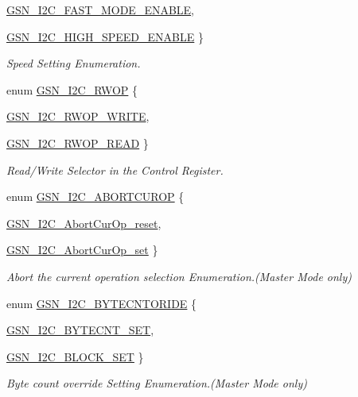 \begin{DoxyCompactItemize}
\hyperlink{a00649_gga75fb1bfd3b52d6ceab35ff62418c6bf6a17def2de96abbf935f2575540969c799}{GSN\_\-I2C\_\-FAST\_\-MODE\_\-ENABLE}, 
\par
\hyperlink{a00649_gga75fb1bfd3b52d6ceab35ff62418c6bf6a1e00b42818c99439a7fc786bba97884f}{GSN\_\-I2C\_\-HIGH\_\-SPEED\_\-ENABLE}
 \}
\begin{DoxyCompactList}\small\item\em Speed Setting Enumeration. \end{DoxyCompactList}\item 
enum \hyperlink{a00649_ga67da6f46815f1aaf8cf6e1a35b13a02c}{GSN\_\-I2C\_\-RWOP} \{ \par
\hyperlink{a00649_gga67da6f46815f1aaf8cf6e1a35b13a02ca05670c9dbe8177c6b8181687371252b8}{GSN\_\-I2C\_\-RWOP\_\-WRITE}, 
\par
\hyperlink{a00649_gga67da6f46815f1aaf8cf6e1a35b13a02ca06637fe79ea8edf62c203c11c2cca718}{GSN\_\-I2C\_\-RWOP\_\-READ}
 \}
\begin{DoxyCompactList}\small\item\em Read/Write Selector in the Control Register. \end{DoxyCompactList}\item 
enum \hyperlink{a00649_ga2ed0e9ed554e26759140e9afffd51eb4}{GSN\_\-I2C\_\-ABORTCUROP} \{ \par
\hyperlink{a00649_gga2ed0e9ed554e26759140e9afffd51eb4ac5cf33d09a8a21ee470a61827adee434}{GSN\_\-I2C\_\-AbortCurOp\_\-reset}, 
\par
\hyperlink{a00649_gga2ed0e9ed554e26759140e9afffd51eb4af3c6cf457cfa893024d5cd527fe834ea}{GSN\_\-I2C\_\-AbortCurOp\_\-set}
 \}
\begin{DoxyCompactList}\small\item\em Abort the current operation selection Enumeration.(Master Mode only) \end{DoxyCompactList}\item 
enum \hyperlink{a00649_ga47ecffee533c3e8638337fb1c33feb17}{GSN\_\-I2C\_\-BYTECNTORIDE} \{ \par
\hyperlink{a00649_gga47ecffee533c3e8638337fb1c33feb17a04fb1c372ab6d5edce35268530fffae3}{GSN\_\-I2C\_\-BYTECNT\_\-SET}, 
\par
\hyperlink{a00649_gga47ecffee533c3e8638337fb1c33feb17a5467187f06dde3b3af5d8682eafb17ad}{GSN\_\-I2C\_\-BLOCK\_\-SET}
 \}
\begin{DoxyCompactList}\small\item\em Byte count override Setting Enumeration.(Master Mode only) \end{DoxyCompactList}\item 

\end{DoxyCompactItemize}
